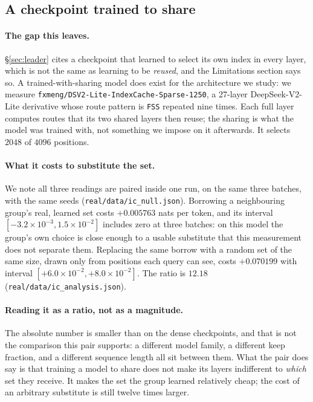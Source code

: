 \documentclass[10pt]{article}
\begin{document}
\subsection{A checkpoint trained to share}
\label{sec:trainedshare}

\paragraph{The gap this leaves.} \S\ref{sec:leader} cites a checkpoint that
learned to select its own index in every layer, which is not the same as
learning to be \emph{reused}, and the Limitations section says so. A
trained-with-sharing model does exist for the architecture we study: we measure
\texttt{fxmeng/DSV2-Lite-IndexCache-Sparse-1250}, a 27-layer DeepSeek-V2-Lite
derivative whose route pattern is \texttt{FSS} repeated nine times. Each full
layer computes routes that its two shared layers then reuse; the sharing is
what the model was trained with, not something we impose on it afterwards. It
selects $2048$ of $4096$ positions.

\paragraph{What it costs to substitute the set.} We note all three readings are
paired inside one run, on the same three batches, with the same seeds
(\texttt{real/data/ic\_null.json}). Borrowing a neighbouring group's real,
learned set costs $+0.005763$ nats per token, and its interval
$[-3.2\times10^{-3}, 1.5\times10^{-2}]$ includes zero at three batches: on this
model the group's own choice is close enough to a usable substitute that this
measurement does not separate them. Replacing the same borrow with a random set
of the same size, drawn only from positions each query can see, costs
$+0.070199$ with interval $[+6.0\times10^{-2}, +8.0\times10^{-2}]$. The ratio is
$12.18$ (\texttt{real/data/ic\_analysis.json}).

\paragraph{Reading it as a ratio, not as a magnitude.} The absolute number is
smaller than on the dense checkpoints, and that is not the comparison this pair
supports: a different model family, a different keep fraction, and a different
sequence length all sit between them. What the pair does say is that training a
model to share does not make its layers indifferent to \emph{which} set they
receive. It makes the set the group learned relatively cheap; the cost of an
arbitrary substitute is still twelve times larger.
\end{document}
